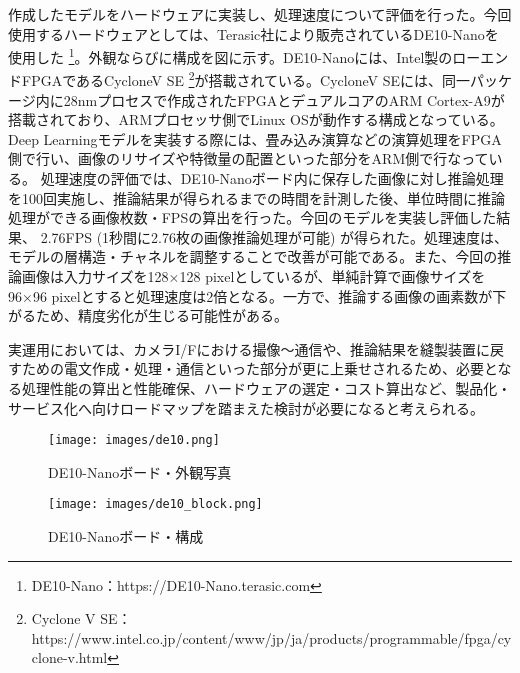 作成したモデルをハードウェアに実装し、処理速度について評価を行った。今回使用するハードウェアとしては、Terasic社により販売されているDE10-Nanoを使用した \footnote{DE10-Nano：https:\slash\slash DE10-Nano.terasic.com}。外観ならびに構成を図に示す。DE10-Nanoには、Intel製のローエンドFPGAであるCycloneV SE \footnote{Cyclone V SE：https:\slash\slash www.intel.co.jp\slash content\slash www\slash jp\slash ja\slash products\slash programmable\slash fpga\slash cyclone-v.html}が搭載されている。CycloneV SEには、同一パッケージ内に28nmプロセスで作成されたFPGAとデュアルコアのARM Cortex-A9が搭載されており、ARMプロセッサ側でLinux OSが動作する構成となっている。Deep Learningモデルを実装する際には、畳み込み演算などの演算処理をFPGA側で行い、画像のリサイズや特徴量の配置といった部分をARM側で行なっている。
処理速度の評価では、DE10-Nanoボード内に保存した画像に対し推論処理を100回実施し、推論結果が得られるまでの時間を計測した後、単位時間に推論処理ができる画像枚数・FPSの算出を行った。今回のモデルを実装し評価した結果、 2.76FPS (1秒間に2.76枚の画像推論処理が可能) が得られた。処理速度は、モデルの層構造・チャネルを調整することで改善が可能である。また、今回の推論画像は入力サイズを128×128 pixelとしているが、単純計算で画像サイズを96×96 pixelとすると処理速度は2倍となる。一方で、推論する画像の画素数が下がるため、精度劣化が生じる可能性がある。

実運用においては、カメラI/Fにおける撮像〜通信や、推論結果を縫製装置に戻すための電文作成・処理・通信といった部分が更に上乗せされるため、必要となる処理性能の算出と性能確保、ハードウェアの選定・コスト算出など、製品化・サービス化へ向けロードマップを踏まえた検討が必要になると考えられる。



\begin{figure}[htbp]
\begin{minipage}{0.5\hsize}
\begin{center}
\texttt{[image: images/de10.png]}
\end{center}
\caption{DE10-Nanoボード・外観写真}
\label{fig:de10}
\end{minipage}
\begin{minipage}{0.5\hsize}
\begin{center}
\texttt{[image: images/de10\_block.png]}
\end{center}
\caption{DE10-Nanoボード・構成}
\label{fig:deblock}
\end{minipage}
\end{figure} 